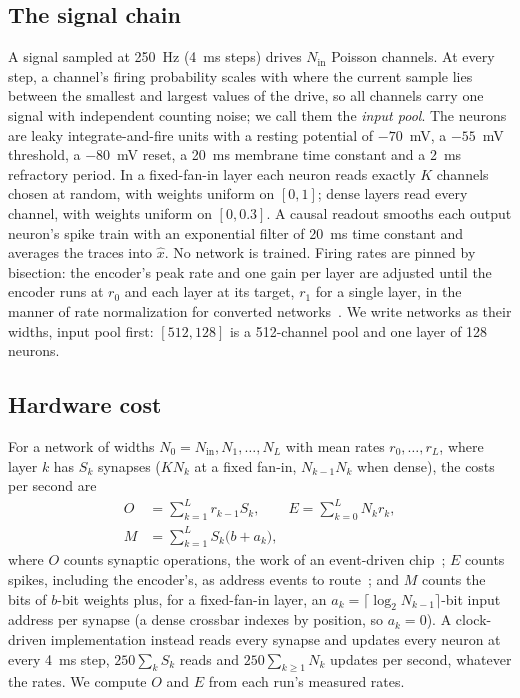 \documentclass[conference]{IEEEtran}
\newcommand{\Nin}{N_\mathrm{in}}
\begin{document}
\subsection{The signal chain}
A signal sampled at 250~Hz (4~ms steps) drives $\Nin$ Poisson channels. At
every step, a channel's firing probability scales with where the current
sample lies between the smallest and largest values of the drive, so all
channels carry one signal with independent counting noise; we call them the
\emph{input pool}. The neurons are leaky integrate-and-fire units with a
resting potential of $-70$~mV, a $-55$~mV threshold, a $-80$~mV reset, a 20~ms
membrane time constant and a 2~ms refractory period. In a fixed-fan-in
layer each neuron reads exactly $K$ channels chosen at random, with weights
uniform on $[0,1]$; dense layers read every channel, with weights uniform on
$[0, 0.3]$. A causal readout smooths each output neuron's spike train with an
exponential filter of 20~ms time constant and averages the traces into
$\hat{x}$. No network is trained. Firing rates are pinned by bisection: the
encoder's peak rate and one gain per layer are adjusted until the encoder runs
at $r_0$ and each layer at its target, $r_1$ for a single layer, in the manner
of rate normalization for converted
networks~\cite{diehl2015balancing,rueckauer2017conversion}. We write
networks as their widths, input pool first: $[512,128]$ is a 512-channel pool
and one layer of 128 neurons.

\subsection{Hardware cost}
For a network of widths $N_0 = \Nin, N_1, \dots, N_L$ with mean rates
$r_0, \dots, r_L$, where layer $k$ has $S_k$ synapses ($K N_k$ at a fixed fan-in,
$N_{k-1} N_k$ when dense), the costs per second are
\begin{align}
O &= \sum_{k=1}^{L} r_{k-1} S_k, \qquad
E = \sum_{k=0}^{L} N_k r_k, \label{eq:cost}\\
M &= \sum_{k=1}^{L} S_k \bigl(b + a_k\bigr),
\label{eq:memory}
\end{align}
where $O$ counts synaptic operations, the work of an event-driven
chip~\cite{sorbaro2020energy}; $E$ counts spikes, including the encoder's, as
address events to route~\cite{boahen2000aer}; and $M$ counts the bits of $b$-bit
weights plus, for a fixed-fan-in layer, an $a_k = \lceil \log_2 N_{k-1}
\rceil$-bit input address per synapse (a dense crossbar indexes by position,
so $a_k = 0$). A clock-driven implementation instead reads every synapse and
updates every neuron at every 4~ms step, $250 \sum_k S_k$ reads and $250
\sum_{k \ge 1} N_k$ updates per second, whatever the rates. We compute $O$ and
$E$ from each run's measured rates.
\end{document}
